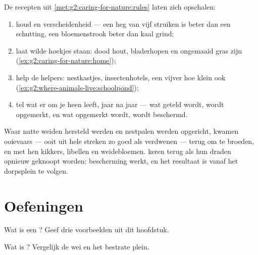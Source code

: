 \begin{method}\label{met:g5:biodiversity:help}
De recepten uit \cref{met:g2:caring-for-nature:rules} laten zich
opschalen:
\begin{enumerate}
  \item houd en  verscheidenheid --- een heg van vijf struiken is
        beter dan een schutting, een bloemenstrook beter dan kaal grind;
  \item laat wilde hoekjes staan: dood hout, bladerhopen en ongemaaid
        gras zijn 
        (\cref{ex:g2:caring-for-nature:home});
  \item help de helpers: nestkastjes, insectenhotels, een vijver hoe
        klein ook
        (\cref{ex:g2:where-animals-live:schoolpond});
  \item tel wat er om je heen leeft, jaar na jaar --- wat geteld wordt,
        wordt opgemerkt, en wat opgemerkt wordt, wordt beschermd.
\end{enumerate}
\end{method}

\begin{example}\label{ex:g5:biodiversity:storks}
Waar natte weiden hersteld werden en nestpalen werden opgericht, kwamen
ooievaars --- ooit uit hele streken zo goed als verdwenen --- terug om
te broeden, en met hen kikkers, libellen en weidebloemen.  keren
terug als hun draden opnieuw geknoopt worden: bescherming werkt, en het
resultaat is vanaf het dorpsplein te volgen.
\end{example}

\section{Oefeningen}

\begin{exercise}[$\star$]\label{exo:g5:biodiversity:1}
Wat is een ? Geef drie voorbeelden uit dit hoofdstuk.
\end{exercise}

\begin{exercise}[$\star$]\label{exo:g5:biodiversity:2}
Wat is ? Vergelijk de wei en het bestrate plein.
\end{exercise}

